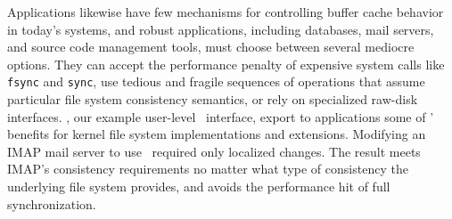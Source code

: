 \begin{comment}
But different extensions within a file system, or different
 applications over the file system, may require different types of
 consistency semantics, and performance suffers when lower layers are
 unnecessarily denied the opportunity to reorder writes;
\Patches\ can implement many consistency mechanisms, including
 soft updates and journaling, and can allow combinations of different
 consistency protocols to exist at the same time.
\Patches\ provide a simple and effective way for such extensions to
 express their requirements of the storage system, adding to the
 requirements already expressed by the file system itself.
\end{comment}


Applications likewise have few mechanisms
 for controlling buffer cache behavior in today's systems, and
%
robust applications, including databases, mail servers, and source code
 management tools, must choose between several mediocre options.
%
They can accept the performance penalty of expensive system calls like
 \texttt{fsync} and \texttt{sync}, use tedious and fragile sequences
 of operations that assume particular file system consistency semantics, or
 rely on specialized raw-disk interfaces.
%
\emph{\Patchgroups}, our example user-level \patch\ interface,
 export to applications some of \patches' benefits
 for kernel file system implementations and extensions.
%
Modifying an IMAP mail server to use \patchgroups\ required only localized
 changes.  The result meets IMAP's consistency requirements no
 matter what type of consistency the underlying file system provides, and
 avoids the performance hit of full synchronization.


\begin{comment}
Our file system modules impose soft updates-style \patch\ requirements by
 default, since doing so requires some knowledge of the file system's
 structures; we have also written a journal module that can change
 existing dependencies to express either full or metadata-only journaling.
%
A file system module not interested in supporting soft updates support
 could instead impose no \patch\ requirements, and count on the journal
 module to provide a consistency guarantee.


The \Kudos\ storage system implementation is decomposed entirely into
 pluggable \modules\ that manipulate \patches, hopefully making the system
 as a whole more configurable, extensible, and easier to understand.
%
Any storage system \module\ can generate \patches; other modules can examine
 them and modify them when required.
%
\Patch\ dependencies are obeyed by all other storage system layers, allowing
 them to be passed through layers such as loopback block devices.
%
As a result, the loosely-coupled \modules\ that implement a file system
 can cooperate to enforce strong and often complex consistency guarantees,
 even though each \module\ only does a small part of the work.
\end{comment}



